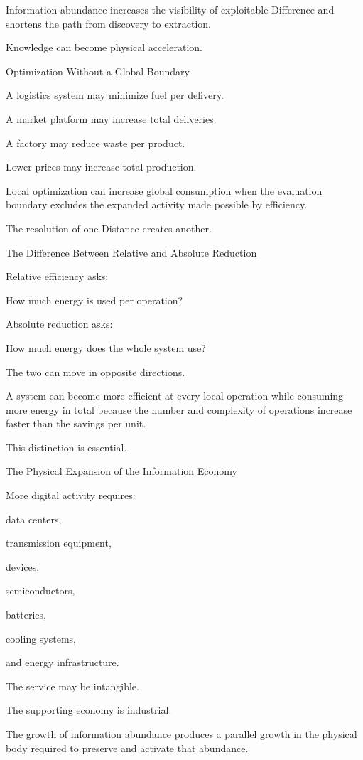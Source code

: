 Information abundance increases the visibility of exploitable Difference and shortens the path from discovery to extraction.

Knowledge can become physical acceleration.

Optimization Without a Global Boundary

A logistics system may minimize fuel per delivery.

A market platform may increase total deliveries.

A factory may reduce waste per product.

Lower prices may increase total production.

Local optimization can increase global consumption when the evaluation boundary excludes the expanded activity made possible by efficiency.

The resolution of one Distance creates another.

The Difference Between Relative and Absolute Reduction

Relative efficiency asks:

How much energy is used per operation?

Absolute reduction asks:

How much energy does the whole system use?

The two can move in opposite directions.

A system can become more efficient at every local operation while consuming more energy in total because the number and complexity of operations increase faster than the savings per unit.

This distinction is essential.

The Physical Expansion of the Information Economy

More digital activity requires:

data centers,

transmission equipment,

devices,

semiconductors,

batteries,

cooling systems,

and energy infrastructure.

The service may be intangible.

The supporting economy is industrial.

The growth of information abundance produces a parallel growth in the physical body required to preserve and activate that abundance.

